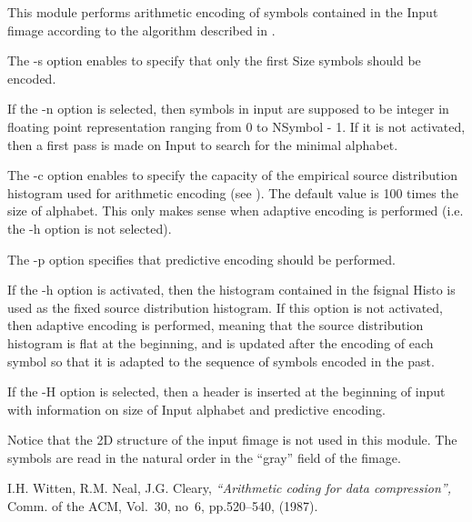 This module performs arithmetic encoding of symbols contained in the Input 
fimage according to the algorithm described in \cite{kn:wnc}. 

The -s option enables to specify that only the first Size symbols should 
be encoded. 

If the -n option is selected, then symbols in input are supposed to be 
integer in floating point representation ranging from 0 to NSymbol - 1. 
If it is not activated, then a first pass is made on Input to search 
for the minimal alphabet. 

The -c option enables to specify the capacity of the empirical source 
distribution histogram used for arithmetic encoding (see \cite{kn:wnc}). 
The default value is 100 times the size of alphabet. This only makes sense 
when adaptive encoding is performed (i.e. the -h option is not selected). 

The -p option specifies that predictive encoding should be performed. 

If the -h option is activated, then the histogram contained in the fsignal 
Histo is used as the fixed source distribution histogram.  
If this option is not activated, then adaptive encoding is performed, 
meaning that the source distribution histogram is flat at the beginning, 
and is updated after the encoding of each symbol so that it is 
adapted to the sequence of symbols encoded in the past. 

If the -H option is selected, then a header is inserted at the beginning 
of input with information on size of Input alphabet and predictive encoding. 

Notice that the 2D structure of the input fimage is not used in this module. 
The symbols are read in the natural order in the ``gray'' field of the fimage. 


\begin{thebibliography}{999999}

 I.H. Witten, R.M. Neal, J.G. Cleary, {\em ``Arithmetic 
coding for data compression'', } Comm. of the ACM, Vol.~30, no~6, pp.520--540, 
(1987). 

\end{thebibliography}
